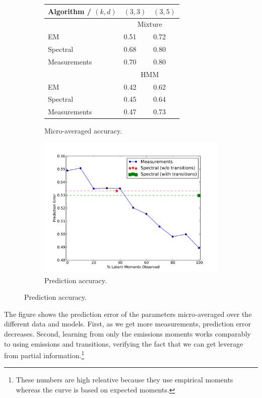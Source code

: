 \begin{figure}
  \centering
  \begin{subfigure}[b]{0.4\textwidth}
    \begin{tabular}{l | l l }
        Algorithm / $(k,d)$ & $(3,3)$ & $(3,5)$ \\ \hline
        & \multicolumn{2}{c}{Mixture} \\
        EM                    & 0.51 & 0.72 \\
        Spectral              & 0.68 & 0.80 \\
        Measurements  & 0.70 & 0.80 \\
        & \multicolumn{2}{c}{HMM} \\
        EM                    & 0.42 & 0.62  \\
        Spectral              & 0.45 & 0.64  \\
        Measurements  & 0.47 & 0.73
    \end{tabular}
    \caption{Micro-averaged accuracy.}
    \label{tab:errors}
  \end{subfigure}
  \begin{subfigure}[b]{0.4\textwidth}
    \includegraphics[width=1.0\textwidth]{figures/measurements.pdf}
    \caption{Prediction accuracy.}
    \label{fig:measurements}
  \end{subfigure}
\end{figure}


The figure
shows the prediction error of the parameters
micro-averaged over the different data and models.  First, as we get more
measurements, prediction error decreases.  Second,
learning from only the emissions moments works comparably
to using emissions and transitions, verifying the fact that
we can get leverage from partial information.\footnote{
These numbers are high releative because they use empirical moments
whereas the curve is based on expected moments.}

